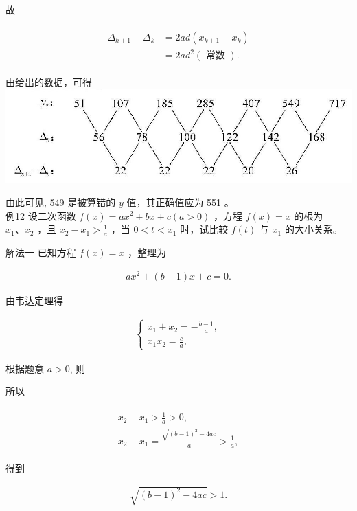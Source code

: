 \documentclass[10pt]{article}
\begin{document}
故

\begin{align*}
\begin{aligned}
\Delta_{k+1}-\Delta_{k} & =2 a d\left(x_{k+1}-x_{k}\right) \\
& =2 a d^{2}(\text { 常数 }) .
\end{aligned}
\end{align*}

由给出的数据，可得\\
\includegraphics[max width=\textwidth, center]{2024_10_30_1bf34f7aeb61f11d11d3g-034}

由此可见, 549 是被算错的 $y$ 值，其正确值应为 551 。\\
例12 设二次函数 $f(x)=a x^{2}+b x+c(a>0)$ ，方程 $f(x)=x$ 的根为 $x_{1} 、 x_{2}$ ，且 $x_{2}-x_{1}>\frac{1}{a}$ ，当 $0<t<x_{1}$ 时，试比较 $f(t)$ 与 $x_{1}$ 的大小关系。

解法一 已知方程 $f(x)=x$ ，整理为

\begin{align*}
a x^{2}+(b-1) x+c=0 .
\end{align*}

由韦达定理得

\begin{align*}
\left\{\begin{array}{l}
x_{1}+x_{2}=-\frac{b-1}{a}, \\
x_{1} x_{2}=\frac{c}{a},
\end{array}\right.
\end{align*}

根据题意 $a>0$, 则

所以

\begin{align*}
\begin{gathered}
x_{2}-x_{1}>\frac{1}{a}>0, \\
x_{2}-x_{1}=\frac{\sqrt{(b-1)^{2}-4 a c}}{a}>\frac{1}{a},
\end{gathered}
\end{align*}

得到

\begin{align*}
\sqrt{(b-1)^{2}-4 a c}>1 . \tag{*}
\end{align*}
\end{document}
